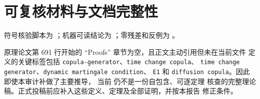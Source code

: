 \documentclass[UTF8,11pt]{ctexart}
\begin{document}
\section{可复核材料与文档完整性}

符号核验脚本为 ；机器可读结论为
；零残差和反例为
。

原理论文第 691 行开始的 “Proofs” 章节为空，且正文主动引用但未在当前文件
定义的关键标签包括 \texttt{copula-generator}、\texttt{time change copula}、
\texttt{time change generator}、\texttt{dynamic martingale condition}、
\texttt{E1} 和 \texttt{diffusion copula}。因此即使本审计补做了主要推导，
当前  仍不是一份自包含、可逐定理
核查的完整理论稿。正式投稿前应补入这些定义、定理及全部证明，并按本报告
修正条件。
\end{document}
